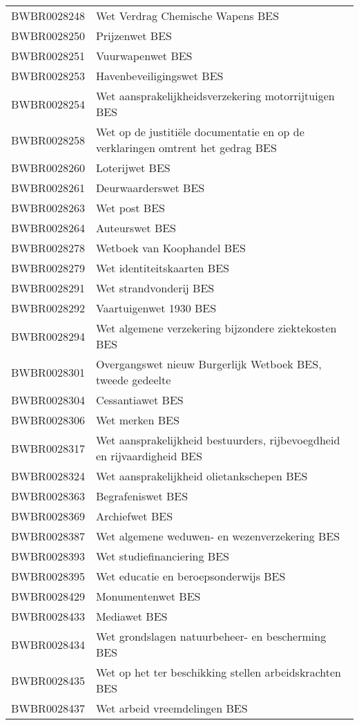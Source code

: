 \begin{longtable}{lp{}}
BWBR0028248 & Wet Verdrag Chemische Wapens BES \\
BWBR0028250 & Prijzenwet BES \\
BWBR0028251 & Vuurwapenwet BES \\
BWBR0028253 & Havenbeveiligingswet BES \\
BWBR0028254 & Wet aansprakelijkheidsverzekering motorrijtuigen BES \\
BWBR0028258 & Wet op de justitiële documentatie en op de verklaringen omtrent het gedrag BES \\
BWBR0028260 & Loterijwet BES \\
BWBR0028261 & Deurwaarderswet BES \\
BWBR0028263 & Wet post BES \\
BWBR0028264 & Auteurswet BES \\
BWBR0028278 & Wetboek van Koophandel BES \\
BWBR0028279 & Wet identiteitskaarten BES \\
BWBR0028291 & Wet strandvonderij BES \\
BWBR0028292 & Vaartuigenwet 1930 BES \\
BWBR0028294 & Wet algemene verzekering bijzondere ziektekosten BES \\
BWBR0028301 & Overgangswet nieuw Burgerlijk Wetboek BES, tweede gedeelte \\
BWBR0028304 & Cessantiawet BES  \\
BWBR0028306 & Wet merken BES \\
BWBR0028317 & Wet aansprakelijkheid bestuurders, rijbevoegdheid en rijvaardigheid BES \\
BWBR0028324 & Wet aansprakelijkheid olietankschepen BES \\
BWBR0028363 & Begrafeniswet BES \\
BWBR0028369 & Archiefwet BES \\
BWBR0028387 & Wet algemene weduwen- en wezenverzekering BES \\
BWBR0028393 & Wet studiefinanciering BES  \\
BWBR0028395 & Wet educatie en beroepsonderwijs BES  \\
BWBR0028429 & Monumentenwet BES \\
BWBR0028433 & Mediawet BES  \\
BWBR0028434 & Wet grondslagen natuurbeheer- en bescherming BES \\
BWBR0028435 & Wet op het ter beschikking stellen arbeidskrachten BES  \\
BWBR0028437 & Wet arbeid vreemdelingen BES  \\

\end{longtable}
